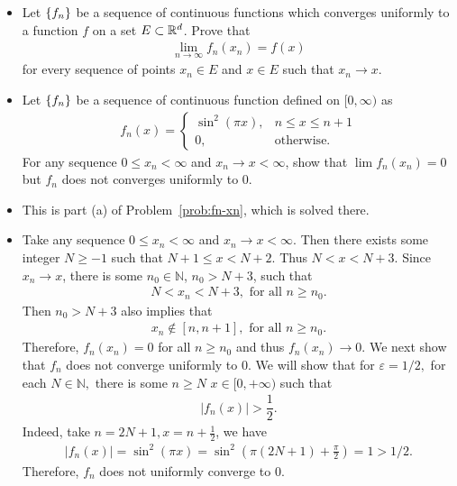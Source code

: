 \begin{problem}
\begin{itemize}
    \item[(a)] Let $\left\{ f_n\right\}$ be a sequence of continuous functions which converges uniformly to a function $f$ on a set $E \subset \mathbb{R}^d$. Prove that 
    \begin{align*}
        \lim_{n \to \infty} f_n(x_n) = f(x)
    \end{align*}
    for every sequence of points $x_n \in E$ and $x \in E$ such that $x_n \to x$.
    \item[(b)] Let $\left\{ f_n\right\}$ be a sequence of continuous function defined on $[0,\infty)$ as 
    \begin{align*}
        f_n(x) = \begin{cases}
        \sin^2(\pi x), & n \le x \le n+1 \\
        0, & \text{otherwise}.
        \end{cases}
    \end{align*}
    For any sequence $0 \le x_n < \infty$ and $x_n \to x < \infty$, show that $\lim f_n(x_n) = 0$ but $f_n$ does not converges uniformly to $0$.
\end{itemize}
\begin{solution}
\begin{itemize}
    \item[(a)] This is part (a) of Problem~\ref{prob:fn-xn}, which is solved there.
    \item[(b)]  Take any sequence $0\le x_n<\infty$ and $x_n\rightarrow x<\infty$. Then there exists some integer $N\ge -1$ such that $N+1\le x< N+2.$ Thus $N<x<N+3.$ Since $x_n\rightarrow x$, there is some $n_0\in\mathbb{N}$, $n_0> N+3$, such that 
    \begin{align*}
        N< x_n<N+3,\text{ for all } n\ge n_0.
    \end{align*}
    Then $n_0>N+3$ also implies  that 
    \begin{align*}
        x_n\notin [n,n+1],\text{ for all }n\ge n_0.
    \end{align*}
    Therefore, $f_n(x_n)=0$ for all $n\ge n_0$ and thus $f_n(x_n)\rightarrow 0.$ We next show that $f_n$ does not converge uniformly to $0.$ We will show that for $\varepsilon=1/2,$ for each $N\in\mathbb{N},$ there is some $n\ge N$ $x\in [0,+\infty)$ such that 
    \begin{align*}
        |f_n(x)|>\dfrac{1}{2}.
    \end{align*}
    Indeed, take $n=2N+1,x=n+\frac{1}{2}$, we have 
    \begin{align*}
        |f_n(x)|=\sin^2{(\pi x)}=\sin^2\left(\pi (2N+1)+\frac{\pi}{2}\right)=1>1/2.
    \end{align*}
    Therefore, $f_n$ does not uniformly converge to $0.$
\end{itemize}
\end{solution}
\end{problem}

